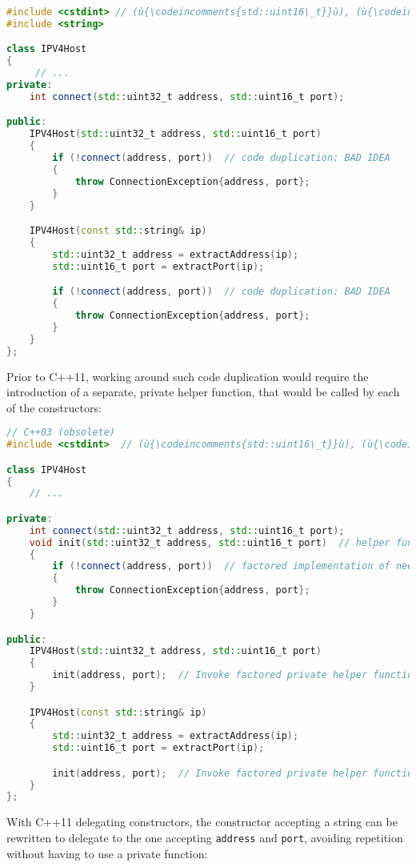 \begin{lstlisting}[language=C++]
#include <cstdint> // (ù{\codeincomments{std::uint16\_t}}ù), (ù{\codeincomments{std::uint32\_t}}ù)
#include <string>

class IPV4Host
{
     // ...
private:
    int connect(std::uint32_t address, std::uint16_t port);

public:
    IPV4Host(std::uint32_t address, std::uint16_t port)
    {
        if (!connect(address, port))  // code duplication: BAD IDEA
        {
            throw ConnectionException{address, port};
        }
    }

    IPV4Host(const std::string& ip)
    {
        std::uint32_t address = extractAddress(ip);
        std::uint16_t port = extractPort(ip);

        if (!connect(address, port))  // code duplication: BAD IDEA
        {
            throw ConnectionException{address, port};
        }
    }
};
\end{lstlisting}

\noindent Prior to C++11, working around such code duplication would require the
introduction of a separate, private helper function, that
would be called by each of the constructors:

\begin{lstlisting}[language=C++]
// C++03 (obsolete)
#include <cstdint>  // (ù{\codeincomments{std::uint16\_t}}ù), (ù{\codeincomments{std::uint32\_t}}ù)

class IPV4Host
{
    // ...

private:
    int connect(std::uint32_t address, std::uint16_t port);
    void init(std::uint32_t address, std::uint16_t port)  // helper function
    {
        if (!connect(address, port))  // factored implementation of needed logic
        {
            throw ConnectionException{address, port};
        }
    }

public:
    IPV4Host(std::uint32_t address, std::uint16_t port)
    {
        init(address, port);  // Invoke factored private helper function.
    }

    IPV4Host(const std::string& ip)
    {
        std::uint32_t address = extractAddress(ip);
        std::uint16_t port = extractPort(ip);

        init(address, port);  // Invoke factored private helper function.
    }
};
\end{lstlisting}

\noindent With C++11 delegating constructors, the constructor accepting a string can be rewritten to
delegate to the one accepting \lstinline!address! and \lstinline!port!,
avoiding repetition without having to use a private function:

